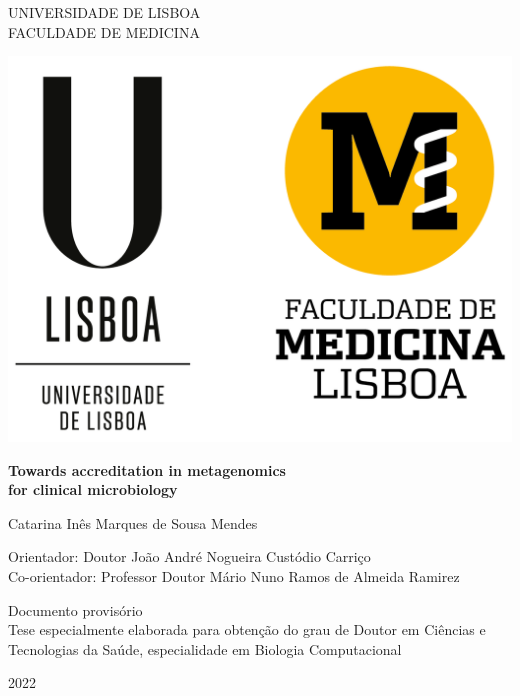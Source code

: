 \begin{titlepage}
    \begin{center}
        UNIVERSIDADE DE LISBOA\\
        FACULDADE DE MEDICINA
        
        \vspace{1cm}
        
        {\includegraphics{figures/cover/UL+FMUL-VerticalPositivo.png}}
        
        \vspace{1cm}

        \huge
        \textbf{Towards accreditation in metagenomics \\[1ex] for clinical microbiology}
        \normalsize
        
        \vspace{1cm}
        
        \large
        Catarina Inês Marques de Sousa Mendes
        \normalsize
        
        \vspace{1cm}
        
        Orientador: Doutor João André Nogueira Custódio Carriço\\
        Co-orientador: Professor Doutor Mário Nuno Ramos de Almeida Ramirez
        
        \vfill
        
        Documento provisório\\
        Tese especialmente elaborada para obtenção do grau de Doutor em Ciências e Tecnologias da Saúde, especialidade em Biologia Computacional\\
        
        \vspace{0.8cm}
        
        2022
        
    \end{center}
\end{titlepage}
